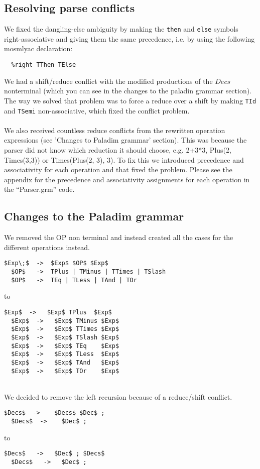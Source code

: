 \subsection{Resolving parse conflicts}
We fixed the dangling-else ambiguity by making the \texttt{then} and
\texttt{else} symbols right-associative and giving them the same precedence,
i.e. by using the following mosmlyac declaration:

\begin{verbatim}
  %right TThen TElse 
\end{verbatim}

\noindent
We had a shift/reduce conflict with the modified productions of the $Decs$
nonterminal (which you can see in the changes to the paladin grammar section).
The way we solved that problem was to force a reduce over a shift by making
\texttt{TId} and \texttt{TSemi} non-associative, which fixed the conflict
problem. \\
\\
We also received countless reduce conflicts from the rewritten operation
expressions (see 'Changes to \textsf{Paladim} grammar' section).  This was
because the parser did not know which reduction it should choose, e.g. 2+3*3,
Plus(2, Times(3,3)) or Times(Plus(2, 3), 3). To fix this we introduced
precedence and associativity for each operation and that fixed the problem.
Please see the appendix for the precedence and associativity assignments for
each operation in the ``Parser.grm'' code.

\subsection{Changes to the \textsf{Paladim} grammar}
We removed the OP non terminal and instead created all the cases for the
different operations instead.
\begin{lstlisting}[style=GrammarStyle]
  $Exp\;$  ->  $Exp$ $OP$ $Exp$ 
  $OP$   ->  TPlus | TMinus | TTimes | TSlash 
  $OP$   ->  TEq | TLess | TAnd | TOr
\end{lstlisting}
to
\begin{lstlisting}[style=GrammarStyle]
  $Exp$  ->   $Exp$ TPlus  $Exp$
  $Exp$  ->   $Exp$ TMinus $Exp$
  $Exp$  ->   $Exp$ TTimes $Exp$
  $Exp$  ->   $Exp$ TSlash $Exp$
  $Exp$  ->   $Exp$ TEq    $Exp$
  $Exp$  ->   $Exp$ TLess  $Exp$
  $Exp$  ->   $Exp$ TAnd   $Exp$
  $Exp$  ->   $Exp$ TOr    $Exp$ 
\end{lstlisting}
\hfill\\
We decided to remove the left recursion because of a reduce/shift conflict.
\begin{lstlisting}[style=GrammarStyle]
  $Decs$  ->    $Decs$ $Dec$ ; 
  $Decs$  ->    $Dec$ ;
\end{lstlisting}
to
\begin{lstlisting}[style=GrammarStyle]
  $Decs$   ->   $Dec$ ; $Decs$
  $Decs$   ->   $Dec$ ;
\end{lstlisting}


